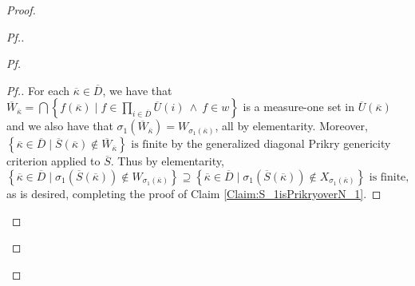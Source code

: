\documentclass{amsart}
\theoremstyle{definition}
\theoremstyle{remark}
\renewcommand{\S}{{\overline{S}}}
\newcommand{\st}{\; | \;}
\newcommand{\set}[2]{\left\{#1\st #2 \right\}}
\begin{document}
\begin{proof}
\begin{proof}[Pf.]
\begin{proof}[Pf]
\begin{proof}[Pf.]
For each $\overline \kappa \in \overline D$, we have that $\overline W_{\overline \kappa} = \bigcap \set{f(\overline \kappa) }{ f \in \prod_{i \in \overline D} \overline U(i) \ \land \ f \in w }$ is a measure-one set in $\overline U(\overline \kappa)$ and we also have that $\sigma_1(\overline W_{\overline \kappa}) = W_{\sigma_1(\overline \kappa)}$, all by elementarity. Moreover, 
$\set{\overline \kappa \in \overline D}{\overline S(\overline \kappa) \notin \overline W_{\overline \kappa}} \text{ is finite}$ by the generalized diagonal Prikry genericity criterion applied to $\overline S$.
Thus by elementarity,
$$\set{ \overline \kappa \in \overline D }{ \sigma_1(\S(\overline \kappa)) \notin W_{\sigma_1(\overline \kappa)} } \supseteq \set{ \overline \kappa \in \overline D }{ \sigma_1(\S(\overline \kappa)) \notin X_{\sigma_1(\overline \kappa)}} \text{ is finite,}$$
as is desired, completing the proof of Claim \ref{Claim:S_1isPrikryoverN_1}.
\end{proof}



\end{proof}
\end{proof}
\end{proof}
\end{document}

